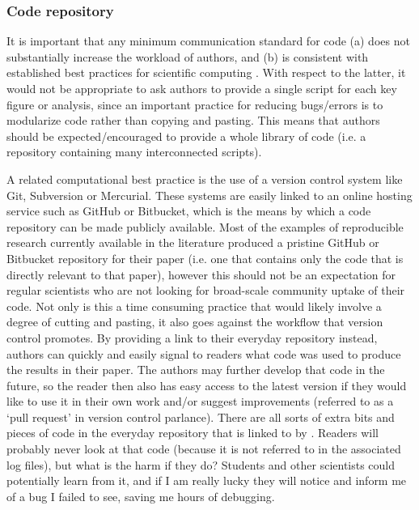 \subsubsection{Code repository}

It is important that any minimum communication standard for code (a) does not substantially increase the workload of authors, and (b) is consistent with established best practices for scientific computing \citep{Wilson2014a}. With respect to the latter, it would not be appropriate to ask authors to provide a single script for each key figure or analysis, since an important practice for reducing bugs/errors is to modularize code rather than copying and pasting. This means that authors should be expected/encouraged to provide a whole library of code (i.e. a repository containing many interconnected scripts).

A related computational best practice is the use of a version control system like Git, Subversion or Mercurial. These systems are easily linked to an online hosting service such as GitHub or Bitbucket, which is the means by which a code repository can be made publicly available. Most of the examples of reproducible research currently available in the literature produced a pristine GitHub or Bitbucket repository for their paper (i.e. one that contains only the code that is directly relevant to that paper), however this should not be an expectation for regular scientists who are not looking for broad-scale community uptake of their code. Not only is this a time consuming practice that would likely involve a degree of cutting and pasting, it also goes against the workflow that version control promotes. By providing a link to their everyday repository instead, authors can quickly and easily signal to readers what code was used to produce the results in their paper. The authors may further develop that code in the future, so the reader then also has easy access to the latest version if they would like to use it in their own work and/or suggest improvements (referred to as a `pull request' in version control parlance). There are all sorts of extra bits and pieces of code in the everyday repository that is linked to by \citet{Irving2016}. Readers will probably never look at that code (because it is not referred to in the associated log files), but what is the harm if they do? Students and other scientists could potentially learn from it, and if I am really lucky they will notice and inform me of a bug I failed to see, saving me hours of debugging.       

